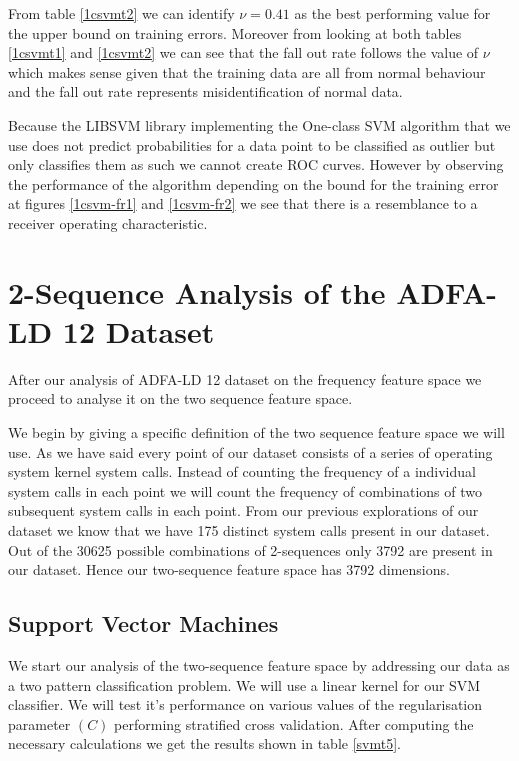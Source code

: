 \documentclass[reqno,openany,12pt]{amsbook}
\begin{document}
From table \ref{1csvmt2} we can identify $\nu=0.41$ as the best performing value for the upper bound on training errors. Moreover from looking at both tables \ref{1csvmt1} and \ref{1csvmt2} we can see that the fall out rate follows the value of $\nu$ which makes sense given that the training data are all from normal behaviour and the fall out rate represents misidentification of normal data. 

Because the LIBSVM library\cite{libsvm} implementing the One-class SVM algorithm that we use does not predict probabilities for a data point to be classified as outlier but only classifies them as such we cannot create ROC curves. 
However by observing the performance of the algorithm depending on the bound for the training error at figures \ref{1csvm-fr1} and \ref{1csvm-fr2} we see that there is a resemblance to a receiver operating characteristic.


\chapter{2-Sequence Analysis of the ADFA-LD 12 Dataset}

After our analysis of ADFA-LD 12 dataset on the frequency feature space we proceed to analyse it on the two sequence feature space. 

We begin by giving a specific definition of the two sequence feature space we will use. As we have said every point of our dataset consists of a series of operating system kernel system calls. Instead of counting the frequency of a individual system calls in each point we will count the frequency of combinations of two subsequent system calls in each point. From our previous explorations of our dataset we know that we have 175 distinct system calls present in our dataset. Out of the 30625 possible combinations of 2-sequences only 3792 are present in our dataset. Hence our two-sequence feature space has 3792 dimensions.



\section{Support Vector Machines}

We start our analysis of the two-sequence feature space by addressing our data as a two pattern classification problem. We will use a linear kernel for our SVM classifier. We will test it's performance on various values of the regularisation parameter $(C)$ performing stratified cross validation. After computing the necessary calculations we get the results shown in table \ref{svmt5}.
\end{document}
